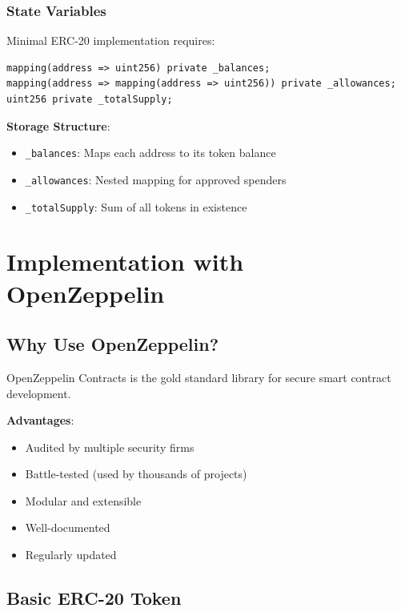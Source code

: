 \documentclass[11pt,a4paper]{article}
\begin{document}
\subsubsection{State Variables}

Minimal ERC-20 implementation requires:

\begin{lstlisting}[language=Solidity]
mapping(address => uint256) private _balances;
mapping(address => mapping(address => uint256)) private _allowances;
uint256 private _totalSupply;
\end{lstlisting}

\textbf{Storage Structure}:
\begin{itemize}
  \item \texttt{\_balances}: Maps each address to its token balance
  \item \texttt{\_allowances}: Nested mapping for approved spenders
  \item \texttt{\_totalSupply}: Sum of all tokens in existence
\end{itemize}

\section{Implementation with OpenZeppelin}

\subsection{Why Use OpenZeppelin?}

OpenZeppelin Contracts is the gold standard library for secure smart contract development.

\textbf{Advantages}:
\begin{itemize}
  \item Audited by multiple security firms
  \item Battle-tested (used by thousands of projects)
  \item Modular and extensible
  \item Well-documented
  \item Regularly updated
\end{itemize}

\subsection{Basic ERC-20 Token}
\end{document}
